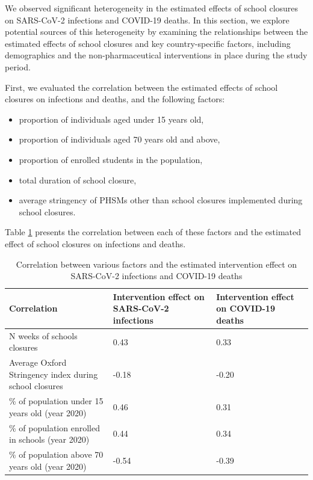 
We observed significant heterogeneity in the estimated effects of school closures on SARS-CoV-2 infections and 
COVID-19 deaths. In this section, we explore potential sources of this heterogeneity by examining the 
relationships between the estimated effects of school closures and key country-specific factors, 
including demographics and the non-pharmaceutical interventions in place during the study period. 

First, we evaluated the correlation between the estimated effects of school closures on infections and deaths, and the following factors:
\begin{itemize}
    \item proportion of individuals aged under 15 years old, 
    \item proportion of individuals aged 70 years old and above,
    \item proportion of enrolled students in the population,
    \item total duration of school closure,
    \item average stringency of PHSMs other than school closures implemented during school closures.
\end{itemize}

Table \ref{tab:correlation} presents the correlation between each of these factors and the 
estimated effect of school closures on infections and deaths. 

\begin{table}[!ht]
    \begin{center}
    \begin{tabular}{|p{9cm}|p{3.5cm}|p{3.5cm}|}
    \hline
    \textbf{Correlation} & \textbf{Intervention effect on SARS-CoV-2 infections} & \textbf{Intervention effect on COVID-19 deaths} \\
    \hline
    N weeks of schools closures & 0.43 & 0.33 \\
    Average Oxford Stringency index during school closures & -0.18 & -0.20 \\
    \% of population under 15 years old (year 2020) & 0.46 & 0.31 \\
    \% of population enrolled in schools (year 2020) & 0.44 & 0.34 \\
    \% of population above 70 years old (year 2020) & -0.54 & -0.39 \\
    \hline
    \end{tabular}
\end{center}
    \caption{Correlation between various factors and the estimated intervention effect on SARS-CoV-2 infections and COVID-19 deaths}
    \label{tab:correlation}
\end{table}

